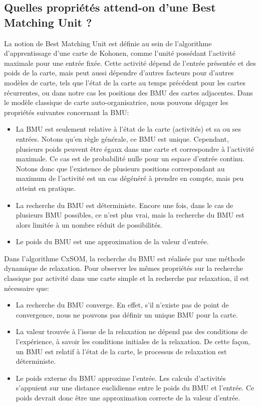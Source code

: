 \documentclass[../main]{subfiles}
\begin{document}
\subsection{Quelles propriétés attend-on d'une Best Matching Unit ?}

La notion de Best Matching Unit est définie au sein de l'algorithme d'apprentissage d'une carte de Kohonen, comme l'unité possédant l'activité maximale pour une entrée fixée. Cette activité dépend de l'entrée présentée et des poids de la carte, mais peut aussi dépendre d'autres facteurs pour d'autres modèles de carte, tels que l'état de la carte au temps précédent pour les cartes récurrentes, ou dans notre cas les positions des BMU des cartes adjacentes.
Dans le modèle classique de carte auto-organisatrice, nous pouvons dégager les propriétés suivantes concernant la BMU:
\begin{itemize}
	\item La BMU est seulement relative à l'état de la carte (activités) et sa ou ses entrées. Notons qu'en règle générale, ce BMU est unique. Cependant, plusieurs poids peuvent être égaux dans une carte et correspondre à l'activité maximale. Ce cas est de probabilité nulle pour un espace d'entrée continu. 
	Notons donc que l'existence de plusieurs positions correspondant au maximum de l'activité est un cas dégénéré à prendre en compte, mais peu atteint en pratique.
	\item La recherche du BMU est déterministe. Encore une fois, dans le cas de plusieurs BMU possibles, ce n'est plus vrai, mais la recherche du BMU est alors limitée à un nombre réduit de possibilités.
	\item Le poids du BMU est une approximation de la valeur d'entrée.
\end{itemize}
Dans l'algorithme CxSOM, la recherche du BMU est réalisée par une méthode dynamique de relaxation. 
Pour observer les mêmes propriétés sur la recherche classique par activité dans une carte simple et la recherche par relaxation, il est nécessaire que:
\begin{itemize}
	\item La recherche du BMU converge. En effet, s'il n'existe pas de point de convergence, nous ne pouvons pas définir un unique BMU pour la carte. 
	\item La valeur trouvée à l'issue de la relaxation ne dépend pas des conditions de l'expérience, à savoir les conditions initiales de la relaxation. De cette façon, un BMU est relatif à l'état de la carte, le processus de relaxation est déterministe.
	\item Le poids externe du BMU approxime l'entrée. Les calculs d'activités s'appuient sur une distance euclidienne entre le poids du BMU et l'entrée. Ce poids devrait donc être une approximation correcte de la valeur d'entrée.
\end{itemize}
\end{document}
